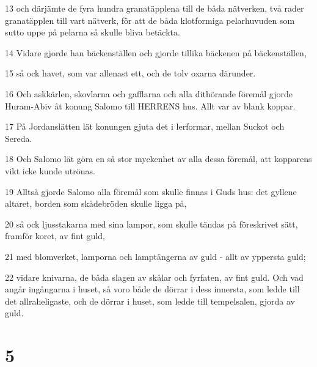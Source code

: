 \par 13 och därjämte de fyra hundra granatäpplena till de båda nätverken, två rader granatäpplen till vart nätverk, för att de båda klotformiga pelarhuvuden som sutto uppe på pelarna så skulle bliva betäckta.
\par 14 Vidare gjorde han bäckenställen och gjorde tillika bäckenen på bäckenställen,
\par 15 så ock havet, som var allenast ett, och de tolv oxarna därunder.
\par 16 Och askkärlen, skovlarna och gafflarna och alla dithörande föremål gjorde Huram-Abiv åt konung Salomo till HERRENS hus. Allt var av blank koppar.
\par 17 På Jordanslätten lät konungen gjuta det i lerformar, mellan Suckot och Sereda.
\par 18 Och Salomo lät göra en så stor myckenhet av alla dessa föremål, att kopparens vikt icke kunde utrönas.
\par 19 Alltså gjorde Salomo alla föremål som skulle finnas i Guds hus: det gyllene altaret, borden som skådebröden skulle ligga på,
\par 20 så ock ljusstakarna med sina lampor, som skulle tändas på föreskrivet sätt, framför koret, av fint guld,
\par 21 med blomverket, lamporna och lamptängerna av guld - allt av yppersta guld;
\par 22 vidare knivarna, de båda slagen av skålar och fyrfaten, av fint guld. Och vad angår ingångarna i huset, så voro både de dörrar i dess innersta, som ledde till det allraheligaste, och de dörrar i huset, som ledde till tempelsalen, gjorda av guld.

\chapter{5}

